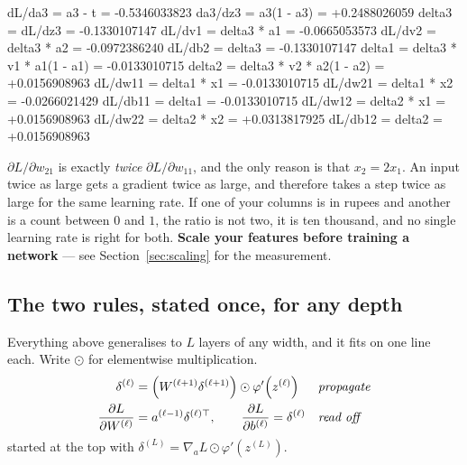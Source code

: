 \documentclass[11pt]{article}
\begin{document}
\begin{codeout}
dL/da3   = a3 - t                    = -0.5346033823
da3/dz3  = a3(1 - a3)                = +0.2488026059
delta3   = dL/dz3                    = -0.1330107147
dL/dv1   = delta3 * a1               = -0.0665053573
dL/dv2   = delta3 * a2               = -0.0972386240
dL/db2   = delta3                    = -0.1330107147
delta1   = delta3 * v1 * a1(1 - a1)  = -0.0133010715
delta2   = delta3 * v2 * a2(1 - a2)  = +0.0156908963
dL/dw11  = delta1 * x1               = -0.0133010715
dL/dw21  = delta1 * x2               = -0.0266021429
dL/db11  = delta1                    = -0.0133010715
dL/dw12  = delta2 * x1               = +0.0156908963
dL/dw22  = delta2 * x2               = +0.0313817925
dL/db12  = delta2                    = +0.0156908963
\end{codeout}

\begin{caution}
$\partial L/\partial w_{21}$ is exactly \emph{twice}
$\partial L/\partial w_{11}$, and the only reason is that $x_2 = 2x_1$. An
input twice as large gets a gradient twice as large, and therefore takes a
step twice as large for the same learning rate. If one of your columns is in
rupees and another is a count between $0$ and $1$, the ratio is not two, it is
ten thousand, and no single learning rate is right for both. \textbf{Scale
your features before training a network} --- see Section~\ref{sec:scaling}
for the measurement.
\end{caution}

\subsection{The two rules, stated once, for any depth}
\label{sec:tworules}

Everything above generalises to $L$ layers of any width, and it fits on one
line each. Write $\odot$ for elementwise multiplication.
\begin{align}
  \delta^{(\ell)}
    &= \left(W^{(\ell+1)}\delta^{(\ell+1)}\right)
       \odot \varphi'\!\left(z^{(\ell)}\right)
    &&\text{\emph{propagate}}
    \label{eq:bp1}\\
  \frac{\partial L}{\partial W^{(\ell)}}
    &= a^{(\ell-1)}\delta^{(\ell)\top},
    \qquad
    \frac{\partial L}{\partial b^{(\ell)}} = \delta^{(\ell)}
    &&\text{\emph{read off}}
    \label{eq:bp2}
\end{align}
started at the top with
$\delta^{(L)} = \nabla_{a}L \odot \varphi'(z^{(L)})$.
\end{document}

